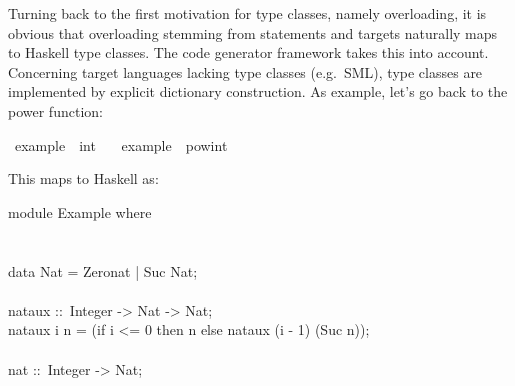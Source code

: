 \begin{isabellebody}
{}
\isamarkuptrue%
%
\isamarkuptrue%
%
\begin{isamarkuptext}%
Turning back to the first motivation for type classes,
  namely overloading, it is obvious that overloading
  stemming from \hyperlink{command.class}{\mbox{}} statements and
  \hyperlink{command.instantiation}{\mbox{}}
  targets naturally maps to Haskell type classes.
  The code generator framework \cite{isabelle-codegen} 
  takes this into account.  Concerning target languages
  lacking type classes (e.g.~SML), type classes
  are implemented by explicit dictionary construction.
  As example, let's go back to the power function:%
\end{isamarkuptext}%
\isamarkuptrue%
%
\isadelimquote
%
\endisadelimquote
%
\isatagquote
{}\isamarkupfalse%
\ example\ {\isacharcolon}{\isacharcolon}\ int\ \isanewline
\ \ {\isachardoublequoteopen}example\ {\isacharequal}\ pow{\isacharunderscore}int\ {}{}\ {\isacharparenleft}{\isacharminus}{}{\isacharparenright}{\isachardoublequoteclose}%
\endisatagquote
{\isafoldquote}%
%
\isadelimquote
%
\endisadelimquote
%
\begin{isamarkuptext}%
\noindent This maps to Haskell as:%
\end{isamarkuptext}%
\isamarkuptrue%
%
\isadelimquote
%
\endisadelimquote
%
\isatagquote
%
\begin{isamarkuptext}%
\isatypewriter%
\noindent%
\hspace*{0pt}module Example where {}\\
\hspace*{0pt}\\
\hspace*{0pt}\\
\hspace*{0pt}data Nat = Zero{}nat | Suc Nat;\\
\hspace*{0pt}\\
\hspace*{0pt}nat{}aux ::~Integer -> Nat -> Nat;\\
\hspace*{0pt}nat{}aux i n = (if i <= 0 then n else nat{}aux (i - 1) (Suc n));\\
\hspace*{0pt}\\
\hspace*{0pt}nat ::~Integer -> Nat;\\

\end{isamarkuptext}
\end{isabellebody}
